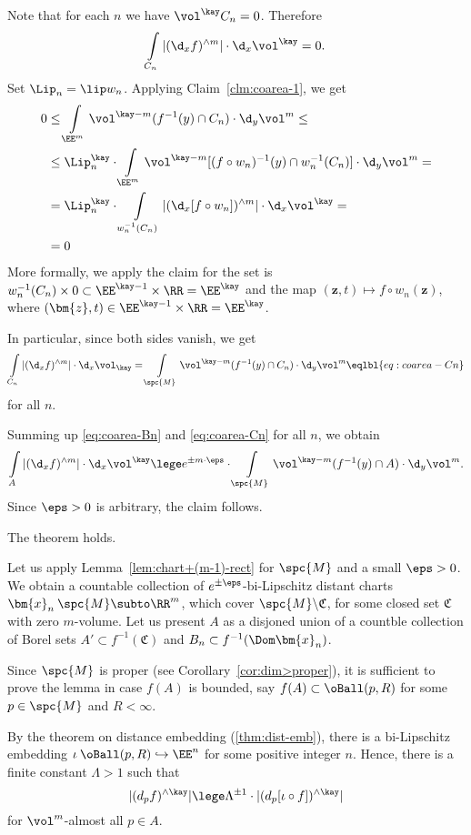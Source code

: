 Note that for each $n$
we have $\vol^\kay C_n=0$.
Therefore
\[\int\limits_{C_n}|(\d_x f)^{\wedge m}|\cdot\d_x\vol^\kay=0.\]
Set $\Lip_n=\lip w_n$.
Applying Claim~\ref{clm:coarea-1}, we get
\begin{align*}
0&\le \int\limits_{\EE^m}
\vol^{\kay-m}( f^{-1}(y)\cap C_n)\cdot\d_y\vol^m
\le 
\\
&\le
\Lip_n^\kay
\cdot
\int\limits_{\EE^m}
\vol^{\kay-m}[( f\circ w_n)^{-1}(y)\cap  w_n^{-1}(C_n)]\cdot\d_y\vol^m
=
\\
&=
\Lip_n^\kay
\cdot
\int\limits_{w_n^{-1}(C_n)}|(\d_x [f\circ w_n])^{\wedge m}|\cdot\d_x\vol^\kay
=
\\
&=0
\end{align*}
More formally, we apply the claim for the set is $w_n^{-1}(C_n)\times 0\subset\EE^{\kay-1}\times \RR=\EE^{\kay}$
and the map 
$(\bm{z},t)\mapsto f\circ w_n(\bm{z})$,
where $(\bm{z},t)\in \EE^{\kay-1}\times \RR=\EE^{\kay}$.

In particular, since both sides vanish, we get
\[\int\limits_{C_n}|(\d_x f)^{\wedge m}|\cdot\d_x\vol_\kay
= \int\limits_{\spc{M}}
\vol^{\kay-m}( f^{-1}(y)\cap C_n)\cdot\d_y\vol^m
\eqlbl{eq:coarea-Cn}\]
for all $n$.

Summing up \ref{eq:coarea-Bn} and \ref{eq:coarea-Cn} for all $n$,
we obtain
\[
\int\limits_A|(\d_x f)^{\wedge m}|\cdot\d_x\vol^\kay
\lege
e^{\pm m\cdot\eps}\cdot\int\limits_{\spc{M}}
\vol^{\kay-m}( f^{-1}(y)\cap A)\cdot\d_y\vol^m.
\]
Since $\eps>0$ is arbitrary, the claim follows.
\claimqeds

\begin{clm}{}\label{clm:coarea-3}
The theorem holds.
\end{clm}



Let us apply Lemma~\ref{lem:chart+(m-1)-rect} for $\spc{M}$ and a small $\eps>0$.
We obtain a countable collection of $e^{\pm\eps}$-bi-Lipschitz distant charts 
$\bm{x}_n\:\spc{M}\subto\RR^m$,
which cover $\spc{M}\backslash\mathfrak{C}$, for some  closed set $\mathfrak{C}$ with zero $m$-volume.
Let us present $A$ as a disjoned union of a countble collection of Borel sets 
$A'\subset f^{-1}(\mathfrak{C})$
and $B_n\subset f^{-1}(\Dom\bm{x}_n)$. 

Since $\spc{M}$ is proper (see Corollary~\ref{cor:dim>proper}),
it is sufficient to prove the lemma in case 
$f(A)$ is bounded, say $f(A)\subset \oBall(p,R)$ for some $p\in\spc{M}$ and $R<\infty$.

By the theorem on distance embedding (\ref{thm:dist-emb}),
there is a bi-Lipschitz embedding 
$\iota\:\oBall(p,R)\hookrightarrow\EE^n$
for some positive integer $n$.
Hence, there is a finite constant $\Lambda>1$ such that
\[|(d_pf)^{\wedge \kay}|
\lege
\Lambda^{\pm1}\cdot|(d_p[\iota\circ f])^{\wedge \kay}|\]
for $\vol^m$-almost all $p\in A$.

